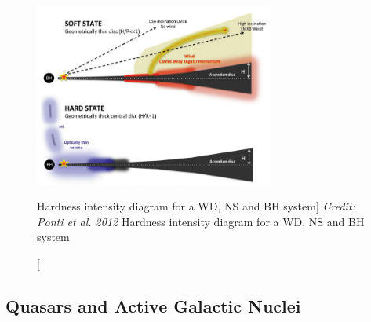 \begin{figure}
\centering
\includegraphics[width=0.7\textwidth]{figures/ponti_wind_cartoon.png}
\caption
[Hardness intensity diagram for a WD, NS and BH system]
{
{\sl Credit: Ponti et al. 2012}
Hardness intensity diagram for a WD, NS and BH system
} 
\label{fig:ponti_cartoon}
\end{figure}

\subsection{Quasars and Active Galactic Nuclei}




